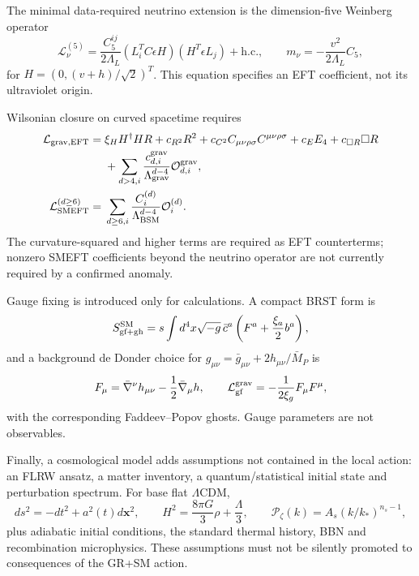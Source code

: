The minimal data-required neutrino extension is the dimension-five Weinberg operator
\begin{equation}
\mathcal L_{\nu}^{(5)}=\frac{C_5^{ij}}{2\Lambda_L}(L_i^TC\epsilon H)(H^T\epsilon L_j)+\mathrm{h.c.},\qquad
m_\nu=-\frac{v^2}{2\Lambda_L}C_5,
\end{equation}
for $H=(0,(v+h)/\sqrt2)^T$.  This equation specifies an EFT coefficient, not its ultraviolet origin.

Wilsonian closure on curved spacetime requires
\begin{align}
\mathcal L_{\rm grav,EFT}={}&\xi_HH^\dagger HR+c_{R^2}R^2+c_{C^2}C_{\mu\nu\rho\sigma}C^{\mu\nu\rho\sigma}+c_EE_4+c_{\Box R}\Box R\\
&+\sum_{d>4,i}\frac{c^{\rm grav}_{d,i}}{\Lambda_{\rm grav}^{d-4}}\mathcal O^{\rm grav}_{d,i},\\
\mathcal L_{\rm SMEFT}^{(d\ge6)}={}&\sum_{d\ge6,i}\frac{C_i^{(d)}}{\Lambda_{\rm BSM}^{d-4}}\mathcal O_i^{(d)}.
\end{align}
The curvature-squared and higher terms are required as EFT counterterms; nonzero SMEFT coefficients beyond the neutrino operator are not currently required by a confirmed anomaly.

Gauge fixing is introduced only for calculations.  A compact BRST form is
\begin{equation}
S_{\rm gf+gh}^{\rm SM}=s\int d^4x\sqrt{-g}\,\bar c^a\left(F^a+\frac{\xi_a}{2}b^a\right),
\end{equation}
and a background de Donder choice for $g_{\mu\nu}=\bar g_{\mu\nu}+2h_{\mu\nu}/\bar M_P$ is
\begin{equation}
F_\mu=\bar\nabla^\nu h_{\mu\nu}-\frac12\bar\nabla_\mu h,\qquad
\mathcal L_{\rm gf}^{\rm grav}=-\frac{1}{2\xi_g}F_\mu F^\mu,
\end{equation}
with the corresponding Faddeev--Popov ghosts.  Gauge parameters are not observables.

Finally, a cosmological model adds assumptions not contained in the local action: an FLRW ansatz, a matter inventory, a quantum/statistical initial state and perturbation spectrum.  For base flat $\Lambda$CDM,
\begin{equation}
ds^2=-dt^2+a^2(t)d\mathbf x^2,\qquad
H^2=\frac{8\pi G}{3}\rho+\frac{\Lambda}{3},\qquad
\mathcal P_\zeta(k)=A_s(k/k_*)^{n_s-1},
\end{equation}
plus adiabatic initial conditions, the standard thermal history, BBN and recombination microphysics.  These assumptions must not be silently promoted to consequences of the GR+SM action.
